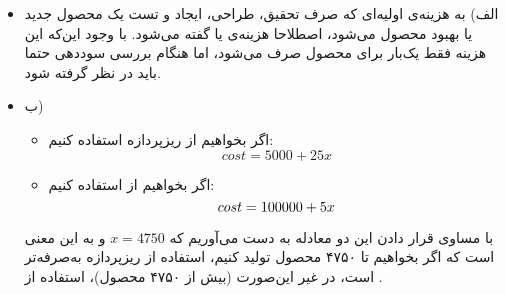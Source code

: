 
\begin{itemize}
	\item الف)
	به هزینه‌ی اولیه‌ای که صرف تحقیق، طراحی، ایجاد و تست یک محصول جدید یا بهبود محصول می‌شود، اصطلاحا هزینه‌ی  یا  گفته می‌شود. با وجود این‌که این هزینه فقط یک‌بار برای محصول صرف می‌شود، اما هنگام بررسی سوددهی حتما باید در نظر گرفته شود.
	\item ب)
	\begin{itemize}
		\item اگر بخواهیم از ریزپردازه استفاده کنیم:
		\begin{equation*}
		cost = 5000 + 25x
		\end{equation*}
		\item 
		اگر بخواهیم از  استفاده کنیم:
		\begin{equation*}
			$$
			cost = 100000 + 5x
			$$
		\end{equation*}
	\end{itemize}
	با مساوی قرار دادن این دو معادله به دست می‌آوریم که $x = 4750$ و به این معنی است که اگر بخواهیم تا ۴۷۵۰ محصول تولید کنیم، استفاده از ریزپردازه به‌صرفه‌تر است، در غیر این‌صورت (بیش از ۴۷۵۰ محصول)، استفاده از .
\end{itemize}